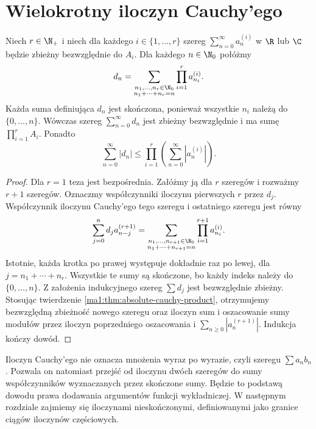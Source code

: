 \section{Wielokrotny iloczyn Cauchy'ego}
\begin{wniosek}
\label{ma1:cor:finite-cauchy-products}
Niech $r\in\N_+$ i niech dla każdego $i\in\{1,\ldots,r\}$ szereg $\sum_{n=0}^\infty a_n^{(i)}$ w $\R$ lub $\C$ będzie zbieżny bezwzględnie do $A_i$. Dla każdego $n\in\N_0$ połóżmy
\[
 d_n=\sum_{\substack{n_1,\ldots,n_r\in\N_0\\
                         n_1+\cdots+n_r=n}}
                    \prod_{i=1}^r a_{n_i}^{(i)}.
\]
Każda suma definiująca $d_n$ jest skończona, ponieważ wszystkie $n_i$ należą do $\{0,\ldots,n\}$. Wówczas szereg $\sum_{n=0}^\infty d_n$ jest zbieżny bezwzględnie i ma sumę $\prod_{i=1}^r A_i$. Ponadto
\[
 \sum_{n=0}^\infty |d_n|
 \le \prod_{i=1}^r\left(\sum_{n=0}^\infty |a_n^{(i)}|\right).
\]
\end{wniosek}
\begin{proof}
Dla $r=1$ teza jest bezpośrednia. Załóżmy ją dla $r$ szeregów i rozważmy $r+1$ szeregów. Oznaczmy współczynniki iloczynu pierwszych $r$ przez $d_j$. Współczynnik iloczynu Cauchy'ego tego szeregu i ostatniego szeregu jest równy
\[
 \sum_{j=0}^n d_j a_{n-j}^{(r+1)}
 =\sum_{\substack{n_1,\ldots,n_{r+1}\in\N_0\\
                        n_1+\cdots+n_{r+1}=n}}
             \prod_{i=1}^{r+1} a_{n_i}^{(i)}.
\]
Istotnie, każda krotka po prawej występuje dokładnie raz po lewej, dla $j=n_1+\cdots+n_r$. Wszystkie te sumy są skończone, bo każdy indeks należy do $\{0,\ldots,n\}$. Z założenia indukcyjnego szereg $\sum d_j$ jest bezwzględnie zbieżny. Stosując twierdzenie \ref{ma1:thm:absolute-cauchy-product}, otrzymujemy bezwzględną zbieżność nowego szeregu oraz iloczyn sum i oszacowanie sumy modułów przez iloczyn poprzedniego oszacowania i $\sum_{n\ge0}|a_n^{(r+1)}|$. Indukcja kończy dowód.
\end{proof}
\begin{uwaga}
Iloczyn Cauchy'ego nie oznacza mnożenia wyraz po wyrazie, czyli szeregu $\sum a_nb_n$. Pozwala on natomiast przejść od iloczynu dwóch szeregów do sumy współczynników wyznaczanych przez skończone sumy. Będzie to podstawą dowodu prawa dodawania argumentów funkcji wykładniczej. W następnym rozdziale zajmiemy się iloczynami nieskończonymi, definiowanymi jako granice ciągów iloczynów częściowych.
\end{uwaga}
